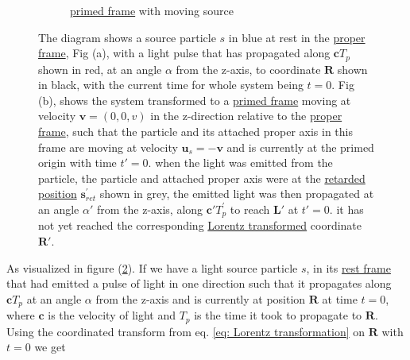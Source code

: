 \begin{figure}[H]
\begin{subfigure}{.49\textwidth}
		\caption{\hyperlink{def-Primed-Frame}{primed frame} with moving source}
		\label{fig: primed frame 1}
	\end{subfigure}
	\caption{The diagram shows a source particle ${s}$ in blue at rest in the \protect\hyperlink{def-proper-frame}{proper frame}, Fig (a), with a light pulse that has propagated along $\mathbf{c} {T}_{p}$ shown in red, at an angle $\alpha$ from the z-axis, to coordinate $\mathbf{R}$ shown in black, with the current time for whole system being ${t} = 0$. Fig (b), shows the system transformed to a \protect\hyperlink{def-Primed-Frame}{primed frame} moving at velocity $\mathbf{v} = (0,0,v)$ in the z-direction relative to the \protect\hyperlink{def-proper-frame}{proper frame}, such that the particle and its attached proper axis in this frame are moving at velocity $\mathbf{u}_s =-\mathbf{v}$ and is currently at the primed origin with time ${t{'}} = 0$. when the light was emitted from the particle, the particle and attached proper axis were at the \protect\hyperlink{def-retarded-position}{retarded position} $\mathbf{s}_{ret}^{'}$ shown in grey, the emitted light was then propagated at an angle $\alpha{'}$ from the z-axis, along $\mathbf{c}{'} {T}_{p}^{'}$ to reach $\mathbf{L}{'}$ at ${t{'}} = 0$. it has not yet reached the corresponding \protect\hyperlink{def-lorentz-transform}{Lorentz transformed} coordinate $\mathbf{R}{'}$.}
	\label{fig: Retarded field outward field transform}
\end{figure}

As visualized in figure (\ref{fig: Retarded field outward field transform}).
If we have a light source particle ${s}$, in its \hyperlink{def-proper-frame}{rest frame} that had emitted a pulse of light in one direction such that it propagates along $\mathbf{c} {T}_{p}$ at an angle $\alpha$ from the z-axis and is currently at position $\mathbf{R}$ at time ${t} = 0$, where $\mathbf{c}$ is the velocity of light and ${T}_{p}$ is the time it took to propagate to $\mathbf{R}$.
Using the coordinated transform from eq.
\eqref{eq: Lorentz transformation} on $\mathbf{R}$ with ${t} = 0$ we get

